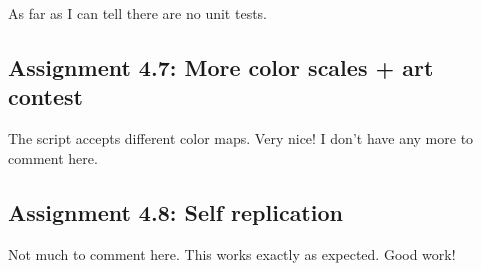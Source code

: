 \documentclass[a4paper]{article}
\begin{document}
As far as I can tell there are no unit tests.


\subsection*{Assignment 4.7: More color scales + art contest}

The script accepts different color maps. Very nice! I don't have any more to comment here.


\subsection*{Assignment 4.8: Self replication}
Not much to comment here. This works exactly as expected. Good work!




\end{document}
